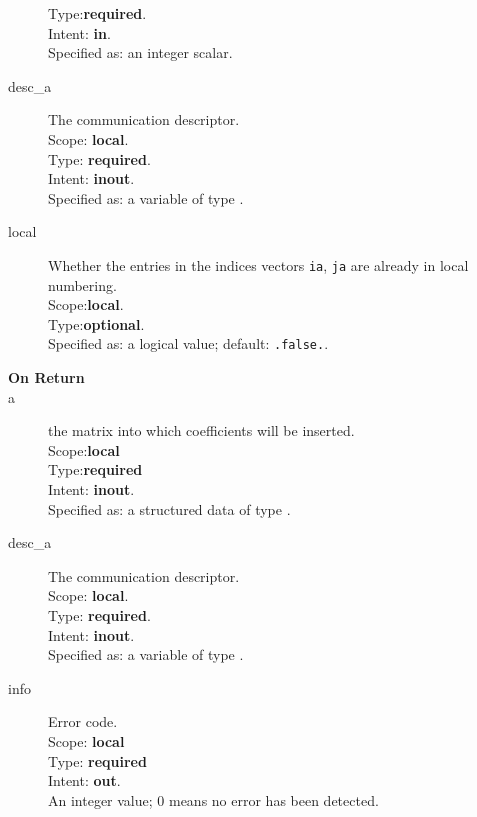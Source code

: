 \begin{description}
Type:{\bf required}.\\
Intent: {\bf in}.\\
Specified as: an integer scalar.
\item[desc\_a] The communication descriptor.\\
Scope: {\bf local}. \\
Type: {\bf required}.\\
Intent: {\bf inout}.\\
Specified as: a variable of type \descdata.\\
\item[local] Whether the entries in the indices vectors \verb|ia|,
  \verb|ja| are already in local  numbering. \\
 Scope:{\bf local}.\\
 Type:{\bf optional}.\\
 Specified as: a logical value; default: \verb|.false.|.

\end{description}

\begin{description}
\item[\bf On Return]
\item[a] the matrix into which coefficients will be inserted.\\
Scope:{\bf local}\\
Type:{\bf required}\\
Intent: {\bf inout}.\\
Specified as: a structured data of type \spdata.
\item[desc\_a] The communication descriptor.\\
Scope: {\bf local}. \\
Type: {\bf required}.\\
Intent: {\bf inout}.\\
Specified as: a variable of type \descdata.\\
\item[info] Error code.\\
Scope: {\bf local} \\
Type: {\bf required} \\
Intent: {\bf out}.\\
An integer value; 0 means no error has been detected. 
\end{description}

